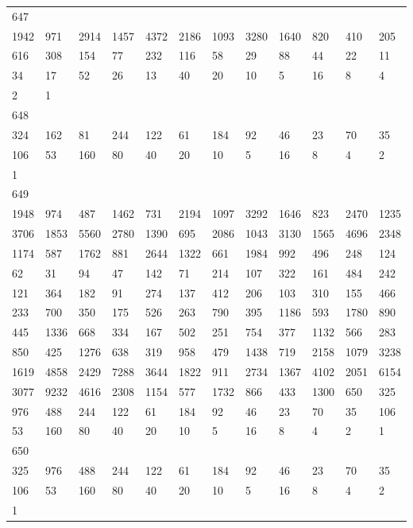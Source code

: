 \begin{longtable}{llllllllllll}
647&&&&&&&&&&&\\
1942& 971& 2914& 1457& 4372& 2186& 1093& 3280& 1640& 820& 410& 205\\
616& 308& 154& 77& 232& 116& 58& 29& 88& 44& 22& 11\\
34& 17& 52& 26& 13& 40& 20& 10& 5& 16& 8& 4\\
2& 1& \\

648&&&&&&&&&&&\\
324& 162& 81& 244& 122& 61& 184& 92& 46& 23& 70& 35\\
106& 53& 160& 80& 40& 20& 10& 5& 16& 8& 4& 2\\
1& \\

649&&&&&&&&&&&\\
1948& 974& 487& 1462& 731& 2194& 1097& 3292& 1646& 823& 2470& 1235\\
3706& 1853& 5560& 2780& 1390& 695& 2086& 1043& 3130& 1565& 4696& 2348\\
1174& 587& 1762& 881& 2644& 1322& 661& 1984& 992& 496& 248& 124\\
62& 31& 94& 47& 142& 71& 214& 107& 322& 161& 484& 242\\
121& 364& 182& 91& 274& 137& 412& 206& 103& 310& 155& 466\\
233& 700& 350& 175& 526& 263& 790& 395& 1186& 593& 1780& 890\\
445& 1336& 668& 334& 167& 502& 251& 754& 377& 1132& 566& 283\\
850& 425& 1276& 638& 319& 958& 479& 1438& 719& 2158& 1079& 3238\\
1619& 4858& 2429& 7288& 3644& 1822& 911& 2734& 1367& 4102& 2051& 6154\\
3077& 9232& 4616& 2308& 1154& 577& 1732& 866& 433& 1300& 650& 325\\
976& 488& 244& 122& 61& 184& 92& 46& 23& 70& 35& 106\\
53& 160& 80& 40& 20& 10& 5& 16& 8& 4& 2& 1\\

650&&&&&&&&&&&\\
325& 976& 488& 244& 122& 61& 184& 92& 46& 23& 70& 35\\
106& 53& 160& 80& 40& 20& 10& 5& 16& 8& 4& 2\\
1& \\


\end{longtable}
